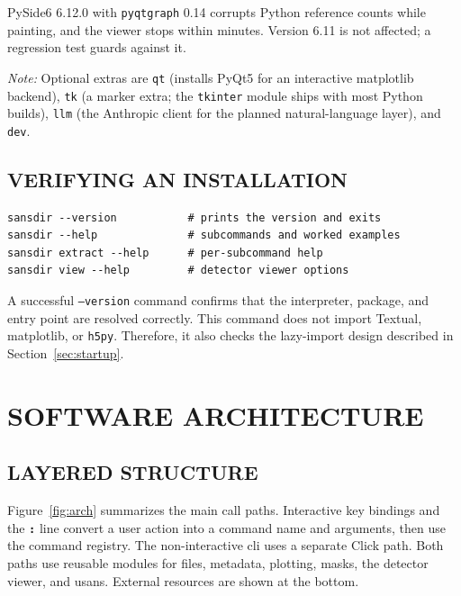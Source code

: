 \documentclass[tm]{ornltm}
\newcommand{\key}[1]{\textbf{\texttt{#1}}}
\begin{document}
\begin{table}[ht]
\begin{threeparttable}
  \begin{tablenotes}
    \item[a] PySide6 6.12.0 with \texttt{pyqtgraph} 0.14 corrupts Python
    reference counts while painting, and the viewer stops within minutes.
    Version 6.11 is not affected; a regression test guards against it.
    \item \emph{Note:} Optional extras are \texttt{qt} (installs PyQt5 for an
    interactive matplotlib backend), \texttt{tk} (a marker extra; the
    \texttt{tkinter} module ships with most Python builds), \texttt{llm} (the
    Anthropic client for the planned natural-language layer), and \texttt{dev}.
  \end{tablenotes}
  \end{threeparttable}
\end{table}

\subsection{VERIFYING AN INSTALLATION}

\begin{lstlisting}[language=shellsession]
sansdir --version           # prints the version and exits
sansdir --help              # subcommands and worked examples
sansdir extract --help      # per-subcommand help
sansdir view --help         # detector viewer options
\end{lstlisting}

A successful \texttt{--version} command confirms that the interpreter, package,
and entry point are resolved correctly. This command does not import Textual,
matplotlib, or \texttt{h5py}. Therefore, it also checks the lazy-import design
described in Section~\ref{sec:startup}.

\section{SOFTWARE ARCHITECTURE}
\label{sec:arch}

\subsection{LAYERED STRUCTURE}

Figure~\ref{fig:arch} summarizes the main call paths. Interactive key bindings
and the \key{:} line convert a user action into a command name and arguments,
then use the command registry. The non-interactive \ac{cli} uses a separate
Click path. Both paths use reusable modules for files, metadata, plotting,
masks, the detector viewer, and \ac{usans}. External resources are shown at the
bottom.
\end{document}
